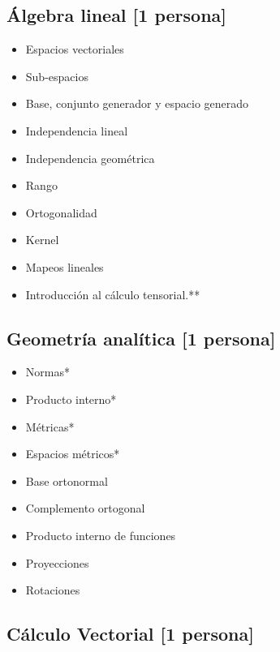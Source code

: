 \documentclass{article}
\begin{document}
        \subsection{Álgebra lineal [1 persona]}

            \begin{itemize}
                \item Espacios vectoriales
                \item Sub-espacios
                \item Base, conjunto generador y espacio generado
                \item Independencia lineal
                \item Independencia geométrica
                \item Rango
                \item Ortogonalidad
                \item Kernel
                \item Mapeos lineales
                \item Introducción al cálculo tensorial.**
            \end{itemize}
        
        \subsection{Geometría analítica [1 persona]}

            \begin{itemize}
                \item Normas*
                \item Producto interno*
                \item Métricas*
                \item Espacios métricos*
                \item Base ortonormal
                \item Complemento ortogonal
                \item Producto interno de funciones
                \item Proyecciones
                \item Rotaciones
            \end{itemize}
                
        \subsection{Cálculo Vectorial [1 persona]}
\end{document}
